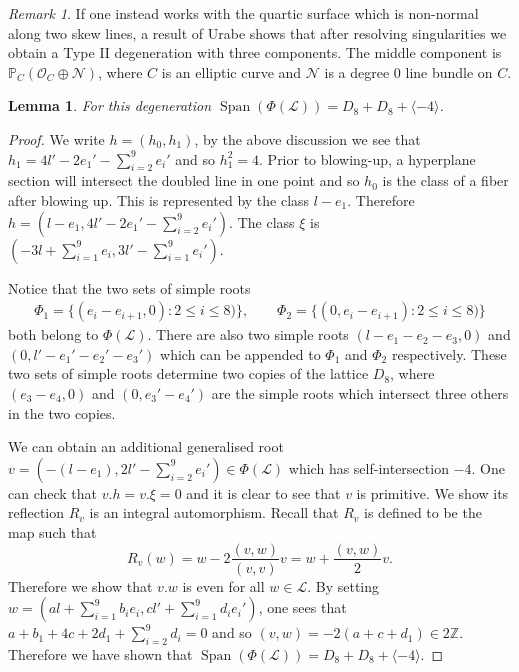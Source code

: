 \documentclass[a4paper]{amsart}
\theoremstyle{definition}
\theoremstyle{plain}
\newtheorem{lemma}[defn]{Lemma}
\theoremstyle{remark}
\newtheorem{rk}[defn]{Remark}
\newcommand{\Z}{\mathbb{Z}}
\begin{document}
\begin{rk}
If one instead works with the quartic surface which is non-normal along two skew lines, a result of Urabe \cite[\S 1 (II-1)]{Ura86} shows that after resolving singularities we obtain a Type II degeneration with three components. The middle component is $\mathbb{P}_C(\mathcal{O}_C\oplus \mathcal{N})$, where $C$ is an elliptic curve and $\mathcal{N}$ is a degree 0 line bundle on $C$.
\end{rk}

\begin{lemma}
For this degeneration $\operatorname{Span}(\Phi(\mathscr{L}))= D_8+D_8+\langle -4 \rangle$.
\end{lemma}
\begin{proof}
We write $h=(h_0,h_1)$, by the above discussion we see that $h_1 = 4l'-2e_1'-\sum_{i=2}^9e_i'$ and so $h_1^2=4$. Prior to blowing-up, a hyperplane section will intersect the doubled line in one point and so $h_0$ is the class of a fiber after blowing up. This is represented by the class $l-e_1$. Therefore $h = (l-e_1,4l'-2e_1'-\sum_{i=2}^9e_i')$. The class $\xi$ is $(-3l+\sum_{i=1}^9e_i,3l'-\sum_{i=1}^9e_i')$.

Notice that the two sets of simple roots
\begin{align*}
\Phi_1 = \{(e_i-e_{i+1},0) : 2\leq i\leq8) \}, \qquad \Phi_2=\{ (0,e_i-e_{i+1}) : 2\leq i \leq 8)\} 
\end{align*}
both belong to $\Phi(\mathscr{L})$. There are also two simple roots $(l-e_1-e_2-e_3,0)$ and $(0,l'-e_1'-e_2'-e_3')$ which can be appended to $\Phi_1$ and $\Phi_2$ respectively. These two sets of simple roots determine two copies of the lattice $D_8$, where $(e_3-e_4,0)$ and $(0,e_3'-e_4')$ are the simple roots which intersect three others in the two copies.

We can obtain an additional generalised root $v=(-(l-e_1),2l'-\sum_{i=2}^9e_i')\in \Phi(\mathscr{L})$ which has self-intersection $-4$. One can check that $v.h=v.\xi=0$ and it is clear to see that $v$ is primitive. We show its reflection $R_v$ is an integral automorphism. Recall that $R_v$ is defined to be the map such that
$$R_v(w) = w-2\frac{(v,w)}{(v,v)}v = w+\frac{(v,w)}{2}v.$$
Therefore we show that $v.w$ is even for all $w \in \mathscr{L}$. By setting $w=(al+\sum_{i=1}^9b_ie_i, cl'+\sum_{i=1}^9d_ie_i')$, one sees that
$a+b_1+4c + 2d_1+\sum_{i=2}^9d_i=0$ and so $(v,w)=-2(a+c+d_1) \in 2\Z$. Therefore we have shown that $\operatorname{Span}(\Phi(\mathscr{L}))=D_8+D_8+\langle -4 \rangle$.
\end{proof}
\end{document}
